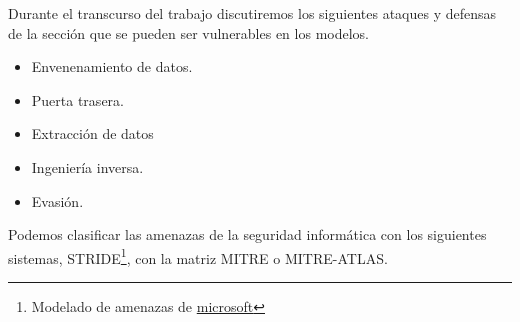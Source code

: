 Durante el transcurso del trabajo discutiremos los siguientes ataques y defensas de la sección  que se pueden ser vulnerables en los modelos. 

\begin{itemize}
    \item Envenenamiento de datos.
    \item Puerta trasera.
    \item Extracción de datos
    \item Ingeniería inversa.
    \item Evasión.
\end{itemize}

Podemos clasificar las amenazas de la seguridad informática con los siguientes sistemas, \gls{STRIDE}\footnote{Modelado de amenazas de \href{https://learn.microsoft.com/es-es/azure/security/develop/threat-modeling-tool-threats}{microsoft}}, con la matriz \gls{MITRE} o \gls{MITRE-ATLAS}.





